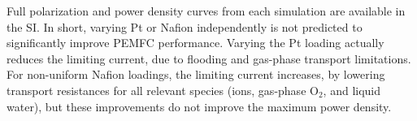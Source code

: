 \documentclass[final,3p,times,twocolumn]{elsarticle}    %
\begin{document}
Full polarization and power density curves from each simulation are available in the SI. In short, varying Pt or Nafion independently is not predicted to significantly improve PEMFC performance. Varying the Pt loading actually reduces the limiting current, due to flooding and gas-phase transport limitations. For non-uniform Nafion loadings, the limiting current increases, by lowering transport resistances for all relevant species (ions, gas-phase O$_2$, and liquid water), but these improvements do not improve the maximum power density.
\end{document}

